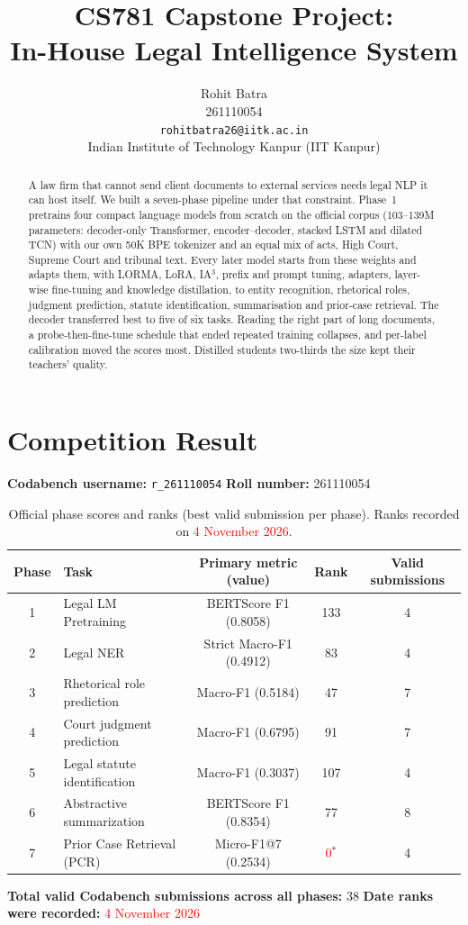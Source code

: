 \documentclass[11pt, oneside]{article}
\title{CS781 Capstone Project:\\
In-House Legal Intelligence System}
\author{
    Rohit Batra  \\
    261110054 \\
    {\tt rohitbatra26@iitk.ac.in}\\
    Indian Institute of Technology Kanpur (IIT Kanpur)
}
\date{}
\newcommand{\todo}[1]{\textcolor{red}{#1}}
\begin{document}
\maketitle
\begin{abstract}
A law firm that cannot send client documents to external services needs legal NLP it can host itself. We built a seven-phase pipeline under that constraint. Phase~1 pretrains four compact language models from scratch on the official corpus (103--139M parameters: decoder-only Transformer, encoder--decoder, stacked LSTM and dilated TCN) with our own 50K BPE tokenizer and an equal mix of acts, High Court, Supreme Court and tribunal text. Every later model starts from these weights and adapts them, with LORMA, LoRA, IA$^3$, prefix and prompt tuning, adapters, layer-wise fine-tuning and knowledge distillation, to entity recognition, rhetorical roles, judgment prediction, statute identification, summarisation and prior-case retrieval. The decoder transferred best to five of six tasks. Reading the right part of long documents, a probe-then-fine-tune schedule that ended repeated training collapses, and per-label calibration moved the scores most. Distilled students two-thirds the size kept their teachers' quality.
\end{abstract}
\section{Competition Result}
\noindent
\textbf{Codabench username:} \texttt{r\_261110054}
\hfill
\textbf{Roll number:} 261110054
\medskip
\noindent
\begin{table}[H]
\centering
\caption{Official phase scores and ranks (best valid submission per phase). Ranks recorded on \todo{4 November 2026}.}
\label{tab:leaderboard}
\begin{tabular}{clccc}
\toprule
Phase & Task & Primary metric (value) & Rank & Valid submissions \\
\midrule
1 & Legal LM Pretraining & BERTScore F1 (0.8058) & 133 & 4 \\
2 & Legal NER & Strict Macro-F1 (0.4912) & 83 & 4 \\
3 & Rhetorical role prediction & Macro-F1 (0.5184) & 47 & 7 \\
4 & Court judgment prediction & Macro-F1 (0.6795) & 91 & 7 \\
5 & Legal statute identification & Macro-F1 (0.3037) & 107 & 4 \\
6 & Abstractive summarization & BERTScore F1 (0.8354) & 77 & 8 \\
7 & Prior Case Retrieval (PCR) & Micro-F1@7 (0.2534) & \todo{0}$^{*}$ & 4 \\
\bottomrule
\end{tabular}

\end{table}
\noindent
\textbf{Total valid Codabench submissions across all phases:} 38
\quad
\textbf{Date ranks were recorded:} \todo{4 November 2026}
\medskip
\end{document}
